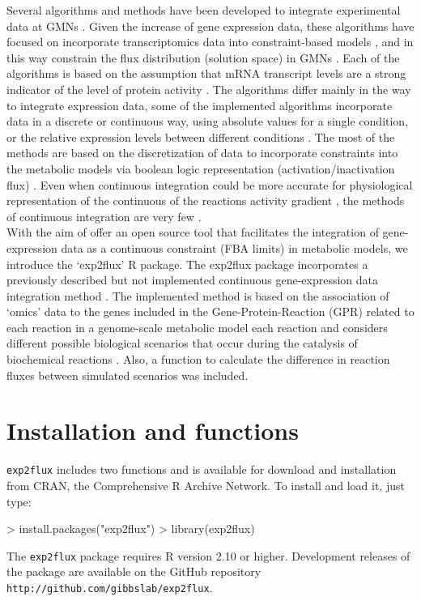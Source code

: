 Several algorithms and methods have been developed to integrate experimental data at GMNs \cite{Machado2014}. Given the increase of gene expression data, these algorithms have focused on incorporate transcriptomics data into constraint-based models \cite{covert2002transcriptional, aakesson2004integration,covert2004integrating}, and in this way constrain the flux distribution (solution space) in GMNs \cite{schellenberger2011quantitative, reed2012shrinking}. Each of the algorithms is based on the assumption that mRNA transcript levels are a strong indicator of the level of protein activity \cite{blazier2012integration}. The algorithms differ mainly in the way to integrate expression data, some of the implemented algorithms incorporate data in a discrete or continuous way, using absolute values for a single condition, or the relative expression levels between different conditions \cite{machado2014systematic}. The most of the methods are based on the discretization of data to incorporate constraints into the metabolic models via boolean logic representation (activation/inactivation flux) \cite{blazier2012integration}. Even when continuous integration could be more accurate for physiological representation of the continuous of the reactions activity gradient \cite{topfer2013integration}, the methods of continuous integration are very few \cite{machado2014systematic}.\\

With the aim of offer an open source tool that facilitates the integration of gene-expression data as a continuous constraint (FBA limits) in metabolic models, we introduce the ‘exp2flux’ R package. The exp2flux package incorporates a previously described but not implemented continuous gene-expression data integration method \cite{colijn2009interpreting,Carbonell2016}. The implemented method is based on the association of `omics' data to the genes included in the Gene-Protein-Reaction (GPR) related to each reaction in a genome-scale metabolic model  each reaction \cite{Thiele2010} and considers different possible biological scenarios that occur during the catalysis of biochemical reactions \cite{colijn2009interpreting}. Also, a function to calculate the difference in reaction fluxes between simulated scenarios was included.

\section{Installation and functions}
\texttt{exp2flux} includes two functions and is available for download and installation from CRAN, the
Comprehensive R Archive Network. To install and load it, just type:
\begin{Schunk}
\begin{Sinput}
> install.packages("exp2flux")
> library(exp2flux)
\end{Sinput}
\end{Schunk}
The \texttt{exp2flux} package requires R version 2.10 or higher. Development releases of the package are available on the GitHub repository \texttt{http://github.com/gibbslab/exp2flux}.
